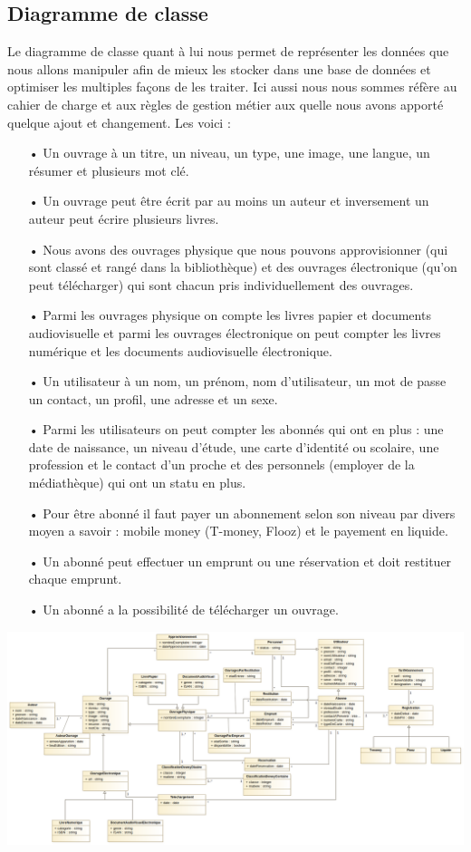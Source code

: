\documentclass[12pt,a4paper]{article}
\begin{document}
\subsection{Diagramme de classe}
Le diagramme de classe quant à lui nous permet de représenter les données que nous 
allons manipuler afin de mieux les stocker dans une base de données et optimiser les multiples
façons de les traiter. Ici aussi nous nous sommes réfère au cahier de charge et 
aux règles de gestion métier aux quelle nous avons apporté quelque ajout et changement.
Les voici :
\begin{itemize}
\item[•] Un ouvrage à un titre, un niveau, un type, une image, une langue, un résumer et
plusieurs mot clé.
\item[•] Un ouvrage peut être écrit par au moins un auteur et inversement un auteur peut
écrire plusieurs livres.
\item[•] Nous avons des ouvrages physique que nous pouvons approvisionner (qui sont
classé et rangé dans la bibliothèque) et des ouvrages électronique (qu'on peut 
télécharger) qui sont chacun pris individuellement des ouvrages.
\item[•] Parmi les ouvrages physique on compte les livres papier et documents
audiovisuelle et parmi les ouvrages électronique on peut compter les livres numérique
et les documents audiovisuelle électronique.
\item[•] Un utilisateur à un nom, un prénom, nom d'utilisateur, un mot de passe un 
contact, un profil, une adresse et un sexe.
\item[•] Parmi les utilisateurs on peut compter les abonnés qui ont en plus : une date
de naissance, un niveau d'étude, une carte d'identité ou scolaire, une profession et le
contact d'un proche et des personnels (employer de la médiathèque) qui ont un statu en 
plus. 
\item[•] Pour être abonné il faut payer un abonnement selon son niveau par divers moyen
a savoir : mobile money (T-money, Flooz) et le payement en liquide.
\item[•] Un abonné peut effectuer un emprunt ou une réservation et doit restituer
chaque emprunt.
\item[•] Un abonné a la possibilité de télécharger un ouvrage.
\end{itemize}
\newpage
\includegraphics[scale=0.25]{images/CD.png}
\newpage
\end{document}

